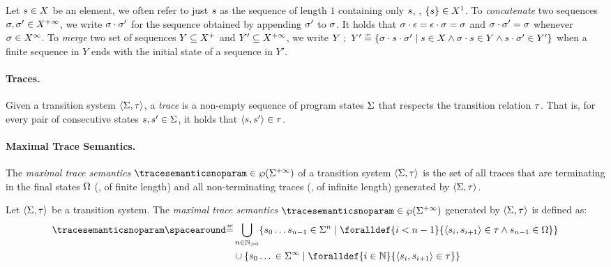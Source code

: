 Let $s\in X$ be an element, we often refer to just $s$ as the sequence of length $1$ containing only $s$, \ie, $\{s\} \in X^1$.
To \emph{concatenate} two sequences $\sigma, \sigma' \in X^{+\infty}$, we write ${\sigma}\cdot{\sigma'}$ for the sequence obtained by appending $\sigma'$ to $\sigma$. It holds that ${\sigma}\cdot{\epsilon} = {\epsilon}\cdot{\sigma} = \sigma$ and ${\sigma}\cdot{\sigma'} = \sigma$ whenever $\sigma \in X^\infty$. To \emph{merge} two set of sequences $Y \subseteq X^+$ and $Y' \subseteq X^{+\infty}$, we write $\mergesequences{Y}{Y'} \defeq \setdef{\concat{\defseq}{\concat{\defstate}{\defseq'}}}{\defstate \in X \land \concat{\defseq}{\defstate} \in Y \land \concat{\defstate}{\defseq'} \in Y'}$ when a finite sequence in $Y$ ends with the initial state of a sequence in $Y'$.

\paragraph{Traces.}

Given a transition system $\langle \Sigma, \tau \rangle$, a \emph{trace} is a non-empty sequence of program states $\Sigma$ that respects the transition relation $\tau$. That is, for every pair of consecutive states $s, s' \in \Sigma$, it holds that $\langle s, s' \rangle \in \tau$.

\paragraph{Maximal Trace Semantics.}

The \emph{maximal trace semantics} $\tracesemanticsnoparam\in\tracetype$ of a transition system $\langle \Sigma, \tau \rangle$ is the set of all traces that are terminating in the final states $\Omega$ (\ie, of finite length) and all non-terminating traces (\ie, of infinite length) generated by $\langle \Sigma, \tau \rangle$.


\begin{definition}
  Let $\langle \Sigma, \tau \rangle$ be a transition system. The \emph{maximal trace semantics} $\tracesemanticsnoparam\in\tracetype$ generated by $\langle \Sigma, \tau \rangle$ is defined as:
  \begin{align*}
    \tracesemanticsnoparam \DefeQ &\bigsetjoin_{n\in\Nposstrict} \setdef{s_0\dots s_{n-1}\in\finitetontraces}{\foralldef{i < n-1}{\tuple{s_i}{s_{i+1}}\in\transitionrelation \land s_{n-1}\in \finalstates}} \\
    &\setjoin \setdef{s_0\dots{}\in\infinitesequences}{\foralldef{i\in\N}{\tuple{s_i}{s_{i+1}}\in\transitionrelation}}
  \end{align*}
\end{definition}

